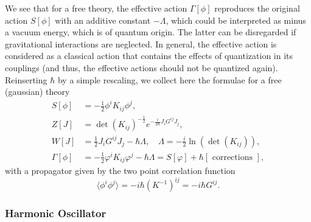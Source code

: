 We see that for a free theory, the effective action \(\Gamma[\phi]\) reproduces the original action \(S[\phi]\) with an additive constant \(-\Lambda\), which could be interpreted as minus a vacuum energy, which is of quantum origin. The latter can be disregarded if gravitational interactions are neglected. In general, the effective action is considered as a classical action that contains the effects of quantization in its couplings (and thus, the effective actions should not be quantized again). Reinserting \(\hbar\) by a simple rescaling, we collect here the formulae for a free (gaussian) theory
\[
    \begin{aligned}
        S[\phi]      & = - \frac{1}{2} \phi^i K_{ij} \phi^j,                                                                 \\
        Z[J]         & = \det(K_{ij})^{-\frac{1}{2}} e^{-\frac{i}{2\hbar} J_i G^{ij} J_j},                                   \\
        W[J]         & = \frac{1}{2} J_i G^{ij} J_j - \hbar\Lambda, \quad \Lambda = -\frac{i}{2} \ln(\det(K_{ij})),          \\
        \Gamma[\phi] & = -\frac{1}{2} \varphi^i K_{ij} \varphi^j - \hbar\Lambda = S[\varphi] + \hbar [\text{ corrections }],
    \end{aligned}
\]
with a propagator given by the two point correlation function
\[
    \langle \phi^{i} \phi^{j} \rangle = -i \hbar (K^{-1})^{ij} = -i \hbar G^{ij}.
\]

\subsubsection{Harmonic Oscillator}

